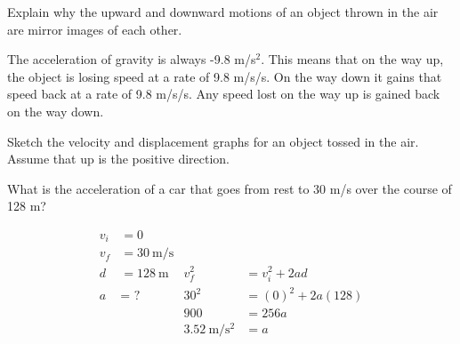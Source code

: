 \documentclass[10pt]{exam}
\begin{document}
\begin{questions}
\begin{multicols}{3}
    \end{multicols}

  
  \question
    Explain why the upward and downward motions of an object thrown in the air are mirror images of each other.
    
    \begin{solution}[\stretch{1}]
      The acceleration of gravity is always -9.8 m/s$^2$.  This means that on the way up, the object is losing speed at a rate of 9.8 m/s/s.  On the way down it gains that speed back at a rate of 9.8 m/s/s.  Any speed lost on the way up is gained back on the way down.  
    \end{solution}

  \question 
    Sketch the velocity and displacement graphs for an object tossed in the air.  Assume that up is the positive direction.

    \begin{multicols}{2}

  
      
    \end{multicols}
  
  \question
    What is the acceleration of a car that goes from rest to 30 m/s over the course of 128 m?

    \begin{solution}[\stretch{1}]
      \begin{align*}
        v_i &= 0    \\
        v_f &= \SI{30}{\meter\per\second} \\
        d   &= \SI{128}{\meter}    & 
                      v_f^2 &= v_i^2 + 2 a d \\
        a &= \text{ ?} & 
                       30^2 &= (0)^2 + 2a(128) \\
        &&              900 &= 256a \\
        && \SI{3.52}{\meter\per\second^2} &= a 
      \end{align*}
    \end{solution}



\end{questions}
\end{document}
